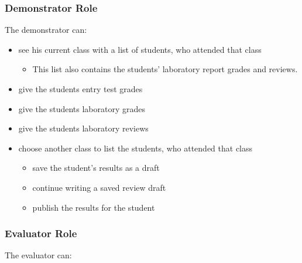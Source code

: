 \subsubsection{Demonstrator Role}

The demonstrator can:

\begin{itemize}
	\item see his current class with a list of students, who attended that class
	\begin{itemize}
		\item This list also contains the students' laboratory report grades and reviews.
	\end{itemize}
	\item give the students entry test grades
	\item give the students laboratory grades
	\item give the students laboratory reviews
	\item choose another class to list the students, who attended that class
	\begin{itemize}
		\item save the student's results as a draft
		\item continue writing a saved review draft
		\item publish the results for the student
	\end{itemize}
\end{itemize}

\subsubsection{Evaluator Role}

The evaluator can:

